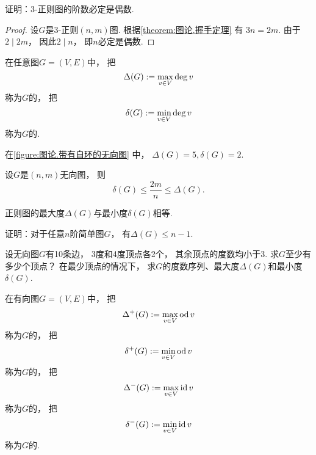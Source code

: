 \begin{example}
证明：\(3\)-正则图的阶数必定是偶数.
\begin{proof}
设\(G\)是\(3\)-正则\((n,m)\)图.
根据\cref{theorem:图论.握手定理} 有
\(3 n = 2 m\).
由于\(2 \mid 2 m\)，
因此\(2 \mid n\)，
即\(n\)必定是偶数.
\end{proof}
\end{example}

\begin{definition}
在任意图\(G = (V,E)\)中，
把\[
	\Delta(G)
	:=
	\max_{v \in V} \deg v
\]称为\(G\)的，
把\[
	\delta(G)
	:=
	\min_{v \in V} \deg v
\]称为\(G\)的.
\end{definition}

在\cref{figure:图论.带有自环的无向图} 中，
\(\Delta(G) = 5,
\delta(G) = 2\).

\begin{proposition}
设\(G\)是\((n,m)\)无向图，
则\[
	\delta(G)
	\leq
	\frac{2m}{n}
	\leq
	\Delta(G).
\]
\end{proposition}

\begin{proposition}
正则图的最大度\(\Delta(G)\)与最小度\(\delta(G)\)相等.
\end{proposition}

\begin{example}
证明：对于任意\(n\)阶简单图\(G\)，
有\(\Delta(G) \leq n-1\).
\end{example}

\begin{example}
设无向图\(G\)有10条边，
3度和4度顶点各2个，
其余顶点的度数均小于3.
求\(G\)至少有多少个顶点？
在最少顶点的情况下，
求\(G\)的度数序列、最大度\(\Delta(G)\)和最小度\(\delta(G)\).
\end{example}

\begin{definition}
在有向图\(G = (V,E)\)中，
把\[
	\Delta^+(G)
	:=
	\max_{v \in V} \operatorname{od} v
\]称为\(G\)的，
把\[
	\delta^+(G)
	:=
	\min_{v \in V} \operatorname{od} v
\]称为\(G\)的，
把\[
	\Delta^-(G)
	:=
	\max_{v \in V} \operatorname{id} v
\]称为\(G\)的，
把\[
	\delta^-(G)
	:=
	\min_{v \in V} \operatorname{id} v
\]称为\(G\)的.
\end{definition}

